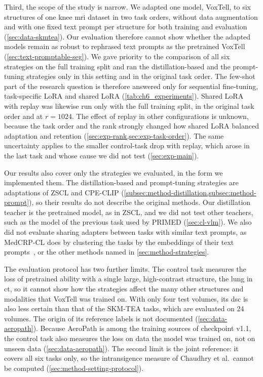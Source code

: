 Third, the scope of the study is narrow.
We adapted one model, VoxTell, to six structures of one knee \gls{mri} dataset in two task orders, without data augmentation and with one fixed text prompt per structure for both training and evaluation (\cref{sec:data-skmtea}).
Our evaluation therefore cannot show whether the adapted models remain as robust to rephrased text prompts as the pretrained VoxTell (\cref{sec:text-promptable-seg}).
We gave priority to the comparison of all six strategies on the full training split and ran the distillation-based and the prompt-tuning strategies only in this setting and in the original task order.
The few-shot part of the research question is therefore answered only for sequential fine-tuning, task-specific LoRA and shared LoRA (\cref{tab:ch6_experiments}).
Shared LoRA with replay was likewise run only with the full training split, in the original task order and at $r = 1024$.
The effect of replay in other configurations is unknown, because the task order and the rank strongly changed how shared LoRA balanced adaptation and retention (\cref{sec:exp-rank,sec:exp-task-order}).
The same uncertainty applies to the smaller control-task drop with replay, which arose in the last task and whose cause we did not test (\cref{sec:exp-main}).

Our results also cover only the strategies we evaluated, in the form we implemented them.
The distillation-based and prompt-tuning strategies are adaptations of ZSCL and CPE-CLIP (\cref{subsec:method-distillation,subsec:method-prompt}), so their results do not describe the original methods.
Our distillation teacher is the pretrained model, as in ZSCL, and we did not test other teachers, such as the model of the previous task used by PRIMED (\cref{sec:cl-vlm}).
We also did not evaluate sharing adapters between tasks with similar text prompts, as MedCRP-CL does by clustering the tasks by the embeddings of their text prompts~\cite{gao2026medcrpcl}, or the other methods named in \cref{sec:method-strategies}.

The evaluation protocol has two further limits.
The control task measures the loss of pretrained ability with a single large, high-contrast structure, the lung in \gls{ct}, so it cannot show how the strategies affect the many other structures and modalities that VoxTell was trained on.
With only four test volumes, its \gls{dsc} is also less certain than that of the SKM-TEA tasks, which are evaluated on 24 volumes.
The origin of its reference labels is not documented (\cref{sec:data-aeropath}).
Because AeroPath is among the training sources of checkpoint v1.1, the control task also measures the loss on data the model was trained on, not on unseen data (\cref{sec:data-aeropath}).
The second limit is the joint reference: it covers all six tasks only, so the intransigence measure of Chaudhry et al.\ cannot be computed (\cref{sec:method-setting-protocol}).

